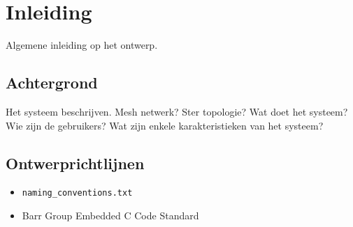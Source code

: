 \section{Inleiding}
Algemene inleiding op het ontwerp.

\subsection{Achtergrond}
Het systeem beschrijven. Mesh netwerk? Ster topologie?
Wat doet het systeem?
Wie zijn de gebruikers?
Wat zijn enkele karakteristieken van het systeem?

\subsection{Ontwerprichtlijnen}
\begin{itemize}
    \item \texttt{naming\_conventions.txt}
    \item Barr Group Embedded C Code Standard       %
\end{itemize}
